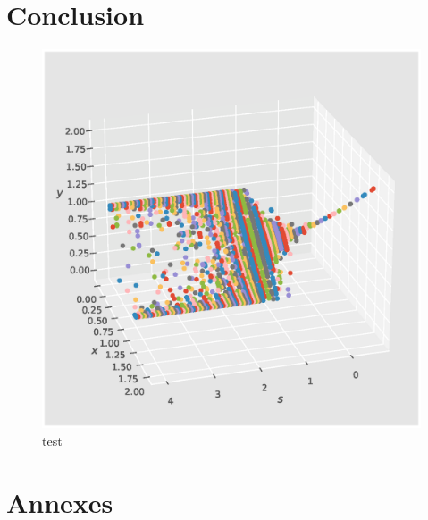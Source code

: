 \documentclass{wsdcr}
\begin{document}
\section{Conclusion}
\begin{figure}[t!]
    \centering
    \includegraphics[width=\linewidth]{fig/lv2_bif3D.eps}
    \caption{test}
    \label{fig:example}
\end{figure}

\section{Annexes}


\end{document}
